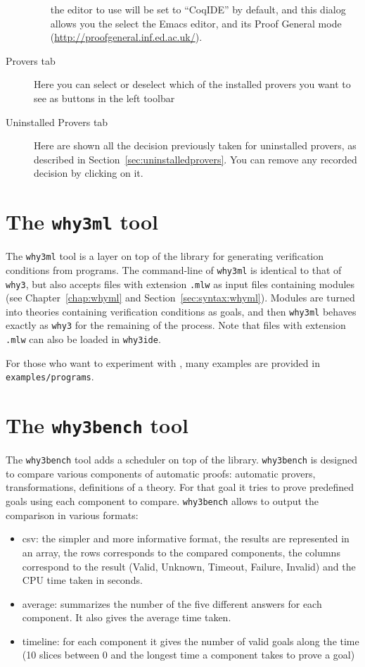 \begin{description}
\begin{itemize}
  the editor to use will be set to ``CoqIDE'' by default, and this
  dialog allows you the select the Emacs editor, and its Proof General
  mode (\url{http://proofgeneral.inf.ed.ac.uk/}).
\end{itemize}
\item[\textsf{Provers} tab]
  Here you can select or deselect which of the installed provers you want to see
  as buttons in the left toolbar
\item[\textsf{Uninstalled Provers} tab] Here are shown all the
  decision previously taken for uninstalled provers, as described in
  Section~\ref{sec:uninstalledprovers}. You can remove any recorded
  decision by clicking on it.
\end{description}

\section{The \texttt{why3ml} tool}

The \texttt{why3ml} tool is a layer on  top of the \why library for
generating verification conditions from \whyml programs.
The command-line of \texttt{why3ml} is identical to that of
\texttt{why3}, but also accepts files with extension \texttt{.mlw} as
input files containing \whyml modules (see Chapter~\ref{chap:whyml}
and Section~\ref{sec:syntax:whyml}). Modules are turned into
theories containing verification conditions as goals, and then
\texttt{why3ml} behaves exactly as \texttt{why3} for the remaining of
the process.
Note that files with extension \texttt{.mlw} can also be loaded in
\texttt{why3ide}.

For those who want to experiment with \whyml, many examples are provided in
\texttt{examples/programs}.

\section{The \texttt{why3bench} tool}

The \texttt{why3bench} tool adds a scheduler on top of the \why
library. \texttt{why3bench} is designed to compare various components
of automatic proofs: automatic provers, transformations, definitions
of a theory. For that goal it tries to prove predefined goals using
each component to compare. \texttt{why3bench} allows to output the
comparison in various formats:
\begin{itemize}
\item csv: the simpler and more informative format, the results are
  represented in an array, the rows corresponds to the
  compared components, the columns correspond to the result
  (Valid, Unknown, Timeout, Failure, Invalid) and the CPU time taken in seconds.
\item average: summarizes the number of the five different answers
  for each component. It also gives the average time taken.
\item timeline: for each component it gives the number of valid goals
  along the time (10 slices between 0 and the longest time a component
  takes to prove a goal)
\end{itemize}

